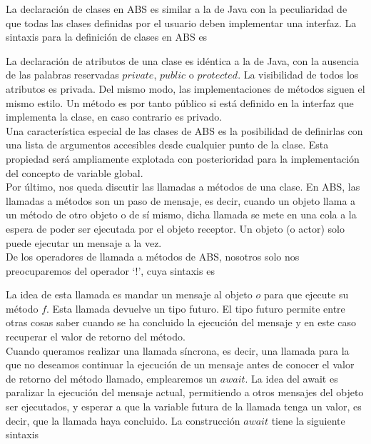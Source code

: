 La declaración de clases en ABS es similar a la de Java con la peculiaridad de que todas las clases definidas por el usuario deben implementar una interfaz. La sintaxis para la definición de clases en ABS es



La declaración de atributos de una clase es idéntica a la de Java, con la ausencia de las palabras reservadas $private$, $public$ o $protected$. La visibilidad de todos los atributos es privada. Del mismo modo, las implementaciones de métodos siguen el mismo estilo. Un método es por tanto público si está definido en la interfaz que implementa la clase, en caso contrario es privado.\\

Una característica especial de las clases de ABS es la posibilidad de definirlas con una lista de argumentos accesibles desde cualquier punto de la clase. Esta propiedad será ampliamente explotada con posterioridad para la implementación del concepto de variable global.\\

Por último, nos queda discutir las llamadas a métodos de una clase. En ABS, las llamadas a métodos son un paso de mensaje, es decir, cuando un objeto llama a un método de otro objeto o de sí mismo, dicha llamada se mete en una cola a la espera de poder ser ejecutada por el objeto receptor. Un objeto (o actor) solo puede ejecutar un mensaje a la vez.\\

De los operadores de llamada a métodos de ABS, nosotros solo nos preocuparemos del operador `$!$', cuya sintaxis es



La idea de esta llamada es mandar un mensaje al objeto $o$ para que ejecute su método $f$. Esta llamada devuelve un tipo futuro. El tipo futuro permite entre otras cosas saber cuando se ha concluido la ejecución del mensaje y en este caso recuperar el valor de retorno del método.\\

Cuando queramos realizar una llamada síncrona, es decir, una llamada para la que no deseamos continuar la ejecución de un mensaje antes de conocer el valor de retorno del método llamado, emplearemos un $await$. La idea del await es paralizar la ejecución del mensaje actual, permitiendo a otros mensajes del objeto ser ejecutados, y esperar a que la variable futura de la llamada tenga un valor, es decir, que la llamada haya concluido. La construcción $await$ tiene la siguiente sintaxis


